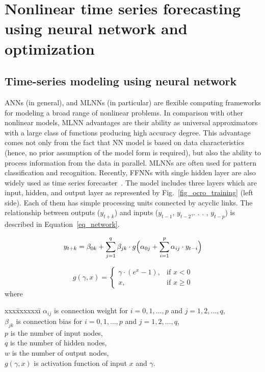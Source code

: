 \documentclass[review,3p,authoryear]{elsarticle}
\begin{document}
\section{Nonlinear time series forecasting using neural network and optimization}
\label{mlnn}

\subsection{Time-series modeling using neural network}
\label{mlnn_model}

ANNs (in general), and MLNNs (in particular) are flexible computing frameworks for modeling a broad range of nonlinear problems. In comparison with other nonlinear models, MLNN advantages are their ability as universal approximators with a large class of functions producing high accuracy degree. This advantage comes not only from the fact that NN model is based on data characteristics (hence, no prior assumption of the model form is required), but also the ability to process information from the data in parallel. MLNNs are often used for pattern classification and recognition. Recently, FFNNs with single hidden layer are also widely used as time series forecaster~\citep{ref_zhang2}. The model includes three layers which are input, hidden, and output layer as represented by Fig.~\ref{fig_ocro_training} (left side). Each of them has simple processing units connected by acyclic links. The relationship between outputs ($y_{t+k}$) and inputs ($y_{t-1}$, $y_{t-2}$,. . . , $y_{t-p}$) is described in Equation~\ref{eq_network}.

\begin{equation} \label{eq_network}
	y_{t+k} = \beta_{0k} + \sum_{j=1}^q \beta_{jk} \cdot g \Bigl( \alpha_{0j} + \sum_{i=1}^p \alpha_{ij} \cdot y_{t-i} \Bigr) 
\end{equation}

\begin{equation} \label{eq_activation}
	g(\gamma, x) = \begin{cases}  \gamma \cdot (e^x - 1) , & \mbox{if } x < 0\\ x, & \mbox{if } x \geq 0 \end{cases}
\end{equation}
where 	
\begin{tabbing}
	xxx\=xxxxxxi\=\kill
	\>	$\alpha_{ij}$	\> is connection weight for	$i = 0, 1,..., p$ and $j = 1, 2,..., q$,	\\
	\>	$\beta_{jk}$	\> is connection bias for $i = 0, 1,..., p$ and $j = 1, 2,..., q$,	\\
	\>	$p$ 			\>	is the number of input nodes,		\\
	\>	$q$ 			\>	is the number of hidden nodes,	\\
	\>	$w$ 			\>	is the number of output nodes, 	\\
	\>	$g(\gamma, x)$ 	\>	is activation function of input $x$ and $\gamma$. 			
\end{tabbing}
\end{document}
